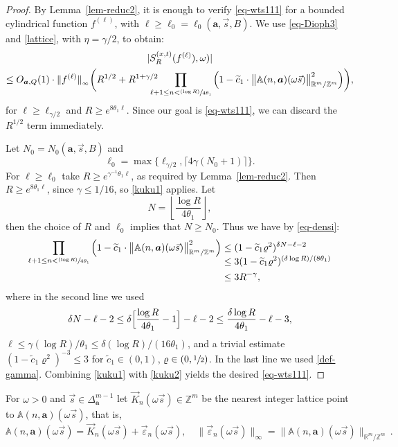 \documentclass[10pt]{amsart}
\newcommand\shalf{\sfrac{1}{2}}
\newcommand{\psfrac}[2]{\sfrac{(#1)}{#2}}
\theoremstyle{plain}
\theoremstyle{definition}
\let\wt\widetilde
\newcommand\bom{{\boldsymbol a}}\let\ba\bom
\let\eps\varepsilon
\let\gam\gamma
\let\om\omega
\newcommand\Aa{\mathbb{A}}
\newcommand{\R}{\mathbb{R}}
\newcommand{\Z}{\mathbb{Z}}
\newcommand\be{\begin{equation}}
\newcommand\ee{\end{equation}}
\begin{document}
\begin{proof}
By Lemma~\ref{lem-reduc2}, it is enough to verify \eqref{eq-wts111} for a bounded cylindrical function $f^{(\ell)}$, with $\ell \ge \ell_0=\ell_0(\bom,\vec s, B)$.
We use \eqref{eq-Dioph3} and \eqref{lattice}, with $\eta = \gam/2$, to obtain:
\begin{multline}
\label{kuku1}
|S^{(x,t)}_R(f^{(\ell)}),\om)|\\
\le O_{\bom,Q}(1)\cdot \|f^{(\ell)}\|_{_\infty} \biggl(R^{1/2}+ R^{1+\gam/2}\!\!\!\!\!\!\prod_{\ell+1\le n < \psfrac{\log R}{4\theta_1}}
\left( 1 - \wt c_1\cdot \bigl\|\Aa(n,\bom) (\om\vec{s})\bigr\|^2_{\R^m/\Z^m} \right)
\biggr),
\end{multline}
for $\ell\ge \ell_{\gam/2}$ and
$R\ge e^{8\theta_1\ell}$.
Since our goal is \eqref{eq-wts111},
we can discard the $R^{1/2}$ term immediately.

Let $N_0 = N_0(\bom,\vec s, B)$ and
\[
\ell_0 =\max\{ \ell_{\gam/2}, \lceil 4\gam (N_0+1)\rceil\}.
\]
For $\ell\ge \ell_0$ take $R\ge e^{\gam^{-1}\theta_1 \ell}$, as required by Lemma~\ref{lem-reduc2}. Then $R\ge e^{8\theta_1\ell}$, since $\gam\le 1/16$, so \eqref{kuku1} applies.
Let
\[
N = \left\lfloor\frac{\log R}{4\theta_1}\right\rfloor,
\]
then the choice of $R$ and $\ell_0$ implies that $N\ge N_0$. Thus we have by \eqref{eq-densi}:
\begin{equation}
\label{kuku2}
\begin{split}
\prod_{\ell+1\le n < \psfrac{\log R}{4\theta_1}}
\left( 1 - \wt c_1\cdot \bigl\|\Aa(n,\bom) (\om\vec{s})\bigr\|^2_{\R^m/\Z^m} \right)
& \le (1-\wt c_1 \varrho^2)^{\delta N-\ell-2} \\[-3.3ex]
& \le 3 (1-\wt c_1 \varrho^2)^{(\delta \log R)/(8\theta_1)} \\
& \le 3 R^{-\gam}, 
\end{split}
\end{equation}
where in the second line we used
\[
\delta N - \ell - 2 \le \delta \Bigl[\frac{\log R}{4\theta_1} - 1\Bigr] -\ell-2 \le \frac{\delta\log R}{4\theta_1} - \ell- 3,
\]
$\ell\le\gam(\log R)/\theta_1\le\delta(\log R)/(16\theta_1)$, and a trivial estimate $(1-\wt c_1 \varrho^2)^{-3}\le3$ for \hbox{$\wt c_1\in(0,1)$}, $\varrho\in (0,\shalf)$. In the last line we used \eqref{def-gamma}.
Combining \eqref{kuku1} with \eqref{kuku2} yields the desired \eqref{eq-wts111}.
\end{proof}

For $\om >0$ and $\vec s\in \Delta_\bom^{m-1}$ let $\vec K_n(\om\vec s)\in \Z^m$ be the nearest integer lattice point to $\Aa(n,\bom) (\om\vec{s})$, that is,
\be \label{def-eps}
\Aa(n,\bom) (\om\vec{s}) = \vec{K}_n(\om\vec s) + \vec{\eps}_n(\om\vec s),\quad \|\vec{\eps}_n(\om\vec s)\|_\infty = \bigl\|\Aa(n,\bom) (\om\vec{s})\bigr\|_{\R^m/\Z^m}\,.
\ee
\end{document}
